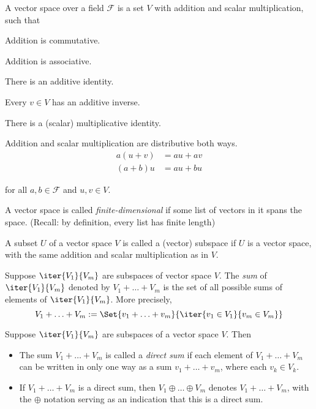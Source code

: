 \label{fc83050}

A vector space over a field $\mathcal F$ is a set $V$ with addition and scalar
multiplication, such that
\begin{enumerati}
  \item Addition is commutative.
  \item Addition is associative.
  \item There is an additive identity.
  \item Every $v\in V$ has an additive inverse.
  \item There is a (scalar) multiplicative identity.
  \item Addition and scalar multiplication are distributive both ways.
  \begin{align*}
    a(u+v) &=au+av \\
    (a+b)u &=au+bu
  \end{align*}

  for all $a,b\in\mathcal F$ and $u,v\in V$.
\end{enumerati}

\label{c4cd6dd}

A vector space is called \textit{finite-dimensional} if some list of vectors in
it spans the space. (Recall: by definition, every list has finite length)

\label{a0f0f06}

A subset $U$ of a vector space $V$ is called a (vector) subspace if $U$ is a
vector space, with the same addition and scalar multiplication as in $V$.

\label{d7c30bb}

Suppose $\iter{V_1}{V_m}$ are subspaces of vector space $V$. The \textit{sum}
of $\iter{V_1}{V_m}$ denoted by $V_1+\ldots+V_m$ is the set of all possible
sums of elements of $\iter{V_1}{V_m}$. More precisely,
$$
  V_1+\ldots+V_m:=\Set{v_1+\ldots+v_m}{\iter{v_1\in V_1}{v_m\in V_m}}
$$

\label{c67c961}

Suppose $\iter{V_1}{V_m}$ are subspaces of a vector space $V$. Then
\begin{itemize}
  \item The sum $V_1+\ldots+V_m$ is called a \textit{direct sum} if each
        element of $V_1+\ldots+V_m$ can be written in only one way as a sum
        $v_1+\ldots+v_m$, where each $v_k\in V_k$.
  \item If $V_1+\ldots+V_m$ is a direct sum, then $V_1\oplus\ldots\oplus V_m$
        denotes $V_1+\ldots+V_m$, with the $\oplus$ notation serving as an
        indication that this is a direct sum.
\end{itemize}

